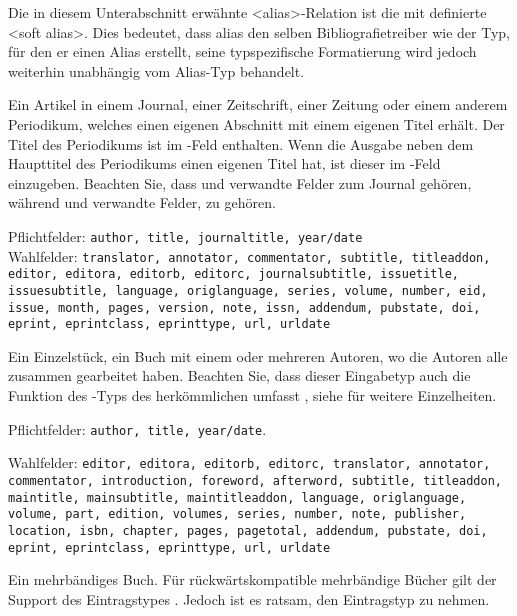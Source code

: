\documentclass{ltxdockit}[2011/03/25]
\begin{document}
Die in diesem Unterabschnitt erwähnte <alias>-Relation ist die mit 
 definierte <soft alias>. Dies bedeutet,
dass alias den selben Bibliografietreiber wie der Typ, für den er einen
Alias erstellt, seine typspezifische Formatierung wird jedoch weiterhin
unabhängig vom Alias-Typ behandelt.

\begin{typelist}


Ein Artikel in einem Journal, einer Zeitschrift, einer Zeitung oder einem
anderem Periodikum, welches einen eigenen Abschnitt mit einem eigenen Titel
erhält. Der Titel des Periodikums ist im -Feld enthalten.
Wenn die Ausgabe neben dem Haupttitel des Periodikums einen eigenen Titel hat,
ist dieser im -Feld einzugeben. Beachten Sie, dass
 und verwandte Felder zum Journal gehören, während
 und verwandte Felder, zu  gehören. 

Pflichtfelder: \texttt{author, title, journaltitle, year/date}\\ 
Wahlfelder:
\texttt{translator, annotator, commentator, subtitle, titleaddon, editor, editora, editorb, editorc, journalsubtitle, issuetitle, issuesubtitle, language, origlanguage, series, volume, number, eid, issue, month, pages, version, note, issn, addendum, pubstate, doi, eprint, eprintclass, eprinttype, url, urldate}


Ein Einzelstück, ein Buch mit einem oder mehreren Autoren, wo die Autoren alle
zusammen gearbeitet haben. Beachten Sie, dass dieser Eingabetyp auch die
Funktion des -Typs des herkömmlichen \bibtex umfasst , siehe
 für weitere Einzelheiten. 

Pflichtfelder: \texttt{author, title, year/date}.

Wahlfelder: \texttt{editor, editora, editorb, editorc,
translator, annotator,\\ commentator, introduction, foreword, afterword, subtitle,
titleaddon,\\
maintitle, mainsubtitle, maintitleaddon, language, origlanguage,
volume, part, edition, volumes, series, number, note, publisher, location, isbn,
chapter, pages, pagetotal, addendum, pubstate, doi, eprint, eprintclass,
eprinttype, url, urldate}


Ein mehrbändiges Buch. Für rückwärtskompatible mehrbändige Bücher gilt der
Support des Eintragstypes . Jedoch ist es ratsam, den
Eintragstyp  zu nehmen.


\end{typelist}
\end{document}
